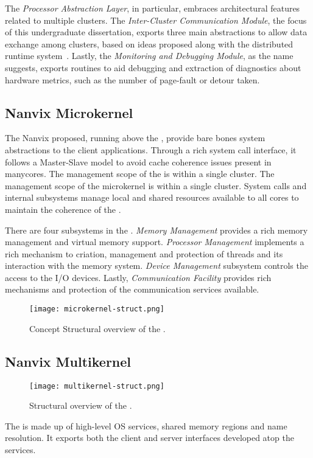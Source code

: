 		The \textit{Processor Abstraction Layer}, in particular, embraces
		architectural features related to multiple clusters.
		The \textit{Inter-Cluster Communication Module}, the focus of
		this undergraduate dissertation, exports three main abstractions
		to allow data exchange among clusters, based on ideas proposed
		along with the \nodeos distributed runtime system~\cite{DeDinechin2013-1}.
		Lastly, the \textit{Monitoring and Debugging Module}, as the
		name suggests, exports routines to aid debugging and extraction
		of diagnostics about hardware metrics, such as the number of
		page-fault or detour taken.

	\subsection{Nanvix Microkernel}
	\label{sec.microkernel}

		The Nanvix \microkernel proposed, running above the \hal, provide
		bare bones system abstractions to the client applications.
		Through a rich system call interface, it follows a Master-Slave \os model
		to avoid cache coherence issues present in manycores.
		The management scope of the \microkernel is within a single cluster.
		The management scope of the microkernel is within a single cluster.
		System calls and internal subsystems manage local and shared resources
		available to all cores to maintain the coherence of the \os.

		There are four subsystems in the \microkernel.
		\textit{Memory Management} provides a rich memory management and virtual
		memory support.
		\textit{Processor Management} implements a rich mechanism to criation,
		management and protection of threads and its interaction with the memory system.
		\textit{Device Management} subsystem controls the access to the I/O devices.
		Lastly, \textit{Communication Facility} provides rich mechanisms and protection of the
		communication services available.

		\begin{figure}[t]
			\centering%
			\caption{Concept Structural overview of the \microkernel.}%
			\label{fig:microkernel-struct}%
			\texttt{[image: microkernel-struct.png]}%
		\end{figure}
	
	\subsection{Nanvix Multikernel}
	\label{sec.multikernel}

		\begin{figure}[t]
			\centering%
			\caption{Structural overview of the \multikernel.}%
			\label{fig:microkernel-struct}%
			\texttt{[image: multikernel-struct.png]}%
		\end{figure}

		The \multikernel is made up of high-level OS services, \eg shared memory
		regions and name resolution.
		It exports both the client and server interfaces developed atop	the \microkernel services.